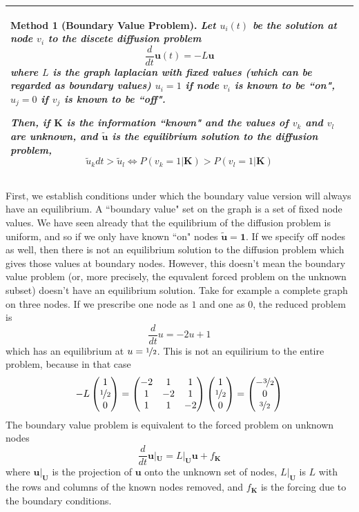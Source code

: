 \documentclass[10pt]{article}
\newtheorem{method}{Method}
\theoremstyle{definition}
\numberwithin{theorem}{section}
\numberwithin{definition}{section}
\numberwithin{lemma}{section}
\numberwithin{corollary}{section}
\numberwithin{clm}{section}
\numberwithin{rmk}{section}
\newenvironment{inbox2}
{\begin{center}
		\begin{tabular}{|p{0.9\textwidth}|}
			\hline \vspace{-0.5 cm}
		}
		{ 
			\\ \hline
		\end{tabular} 
	\end{center}
}
\newcommand{\nhalf}{\nicefrac{1}{2}}
\renewcommand{\b}{\bm}
\begin{document}
\begin{inbox2}
	\begin{method}[Boundary Value Problem]\label{boundarVal}
Let $u_i(t)$ be the solution at node $v_i$ to the discete diffusion problem
\[
\frac{d}{dt}\b{u}(t)  = - L\b{u}
\]
where $L$ is the  graph laplacian with fixed values (which can be regarded as boundary values) $u_i = 1$ if node $v_i$ is known to be ``on", $u_j = 0$ if $v_j$ is known to be ``off". 

Then, if $\b{K}$ is the information ``known" and the values of $v_{k}$ and $v_{l}$ are unknown, and $\b{\tilde{u}}$ is the equilibrium solution to the diffusion problem,
\[
\tilde{u}_k dt >  \tilde{u}_l \Leftrightarrow  P(v_k=  1|\b{K}) > P(v_l = 1|\b{K})
\]
	\end{method}
\end{inbox2}

First, we establish conditions under which the boundary value version will always have an equilibrium. A ``boundary value" set on the graph is a set of fixed node values. We have seen already that the equilibrium of the diffusion problem is uniform, and so if we only have known ``on" nodes $\b{\tilde{u}} = \b{1}$.  If we specify off nodes as well, then there is not an equilibrium solution to the diffusion problem which gives those values at boundary nodes. However, this doesn't mean the boundary value problem (or, more precisely, the equvalent forced problem on the unknown subset) doesn't have an equilibrium solution. Take for example a complete graph on three nodes. If we prescribe one node as $1$ and one as $0$, the reduced problem is
\[
\frac{d}{dt} u = -2u + 1
\]
which has an equilibrium at $u = \nhalf$. This is not an equilirium to the entire problem, because in that case
\[
-L\begin{pmatrix}
1 \\ \nhalf \\ 0
\end{pmatrix} = \begin{pmatrix}
-2 & 1 & 1\\ 1 & -2 & 1 \\ 1 & 1 & -2
\end{pmatrix}\begin{pmatrix}
1 \\ \nhalf \\ 0
\end{pmatrix} = \begin{pmatrix}
-\nicefrac{3}{2} \\ 0 \\ \nicefrac{3}{2}
\end{pmatrix}
\]
The boundary value problem is equivalent to the forced problem on unknown nodes
\[
\frac{d}{dt}\b{u}|_{\b{U}} = L|_{\b{U}}\b{u} + f_{\b{K}}
\]
where $\b{u}|_{\b{U}}$ is the projection of $\b{u}$ onto the unknown set of nodes, $L|_{\b{U}}$ is $L$ with the rows and columns of the known nodes removed, and $f_{\b{K}}$ is the forcing due to the boundary conditions.
	
\end{document}
